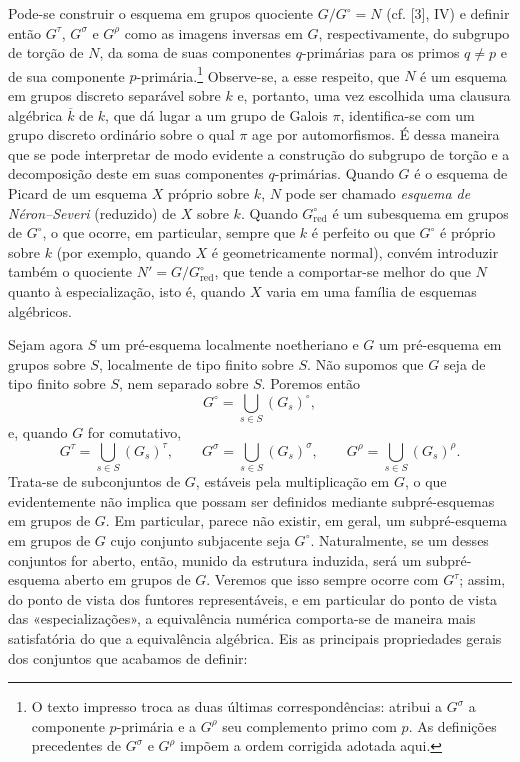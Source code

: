  Pode-se construir o esquema em grupos quociente
$G/G^\circ=N$ (cf. [3], IV) e definir então $G^\tau$, $G^\sigma$ e
$G^\rho$ como as imagens inversas em $G$, respectivamente, do subgrupo de
torção de $N$, da soma de suas componentes $q$-primárias para os primos
$q\neq p$ e de sua componente $p$-primária.\footnote{O texto impresso troca
as duas últimas correspondências: atribui a $G^\sigma$ a componente
$p$-primária e a $G^\rho$ seu complemento primo com $p$. As definições
precedentes de $G^\sigma$ e $G^\rho$ impõem a ordem corrigida adotada aqui.}
Observe-se, a esse respeito, que $N$ é um esquema em grupos discreto separável
sobre $k$ e, portanto, uma vez escolhida uma clausura algébrica $\overline k$
de $k$, que dá lugar a um grupo de Galois $\pi$, identifica-se com um grupo
discreto ordinário sobre o qual $\pi$ age por automorfismos. É dessa maneira
que se pode interpretar de modo evidente a construção do subgrupo de torção e
a decomposição deste em suas componentes $q$-primárias. Quando $G$ é o esquema
de Picard de um esquema $X$ próprio sobre $k$, $N$ pode ser chamado
\emph{esquema de Néron--Severi} (reduzido) de $X$ sobre $k$. Quando
$G^\circ_{\mathrm{red}}$ é um subesquema em grupos de $G^\circ$, o que
ocorre, em particular, sempre que $k$ é perfeito ou que $G^\circ$ é próprio
sobre $k$ (por exemplo, quando $X$ é geometricamente normal), convém introduzir
também o quociente $N'=G/G^\circ_{\mathrm{red}}$, que tende a comportar-se
melhor do que $N$ quanto à especialização, isto é, quando $X$ varia em uma
família de esquemas algébricos.

Sejam agora $S$ um pré-esquema localmente noetheriano e $G$ um pré-esquema em
grupos sobre $S$, localmente de tipo finito sobre $S$. Não supomos que $G$ seja
de tipo finito sobre $S$, nem separado sobre $S$. Poremos então
\[
G^\circ=\bigcup_{s\in S}(G_s)^\circ,
\]
e, quando $G$ for comutativo,
\[
G^\tau=\bigcup_{s\in S}(G_s)^\tau,
\qquad
G^\sigma=\bigcup_{s\in S}(G_s)^\sigma,
\qquad
G^\rho=\bigcup_{s\in S}(G_s)^\rho.
\]
Trata-se de subconjuntos de $G$, estáveis pela multiplicação em $G$, o que
evidentemente não implica que possam ser definidos mediante subpré-esquemas em
grupos de $G$. Em particular, parece não existir, em geral, um subpré-esquema
em grupos de $G$ cujo conjunto subjacente seja $G^\circ$. Naturalmente, se um
desses conjuntos for aberto, então, munido da estrutura induzida, será um
subpré-esquema aberto em grupos de $G$. Veremos que isso sempre ocorre com
$G^\tau$; assim, do ponto de vista dos funtores representáveis, e em particular
do ponto de vista das «especializações», a equivalência numérica comporta-se
de maneira mais satisfatória do que a equivalência algébrica. Eis as principais
propriedades gerais dos conjuntos que acabamos de definir:

